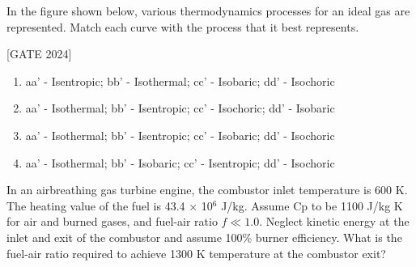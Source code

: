     \item In the figure shown below, various thermodynamics processes for an ideal gas are represented. Match each curve with the process that it best represents.
   \begin{figure}[!ht]
\centering
{}%

\end{figure}
   
        \hfill{[GATE 2024]}\begin{enumerate}
            \item aa' - Isentropic; bb' - Isothermal; cc' - Isobaric; dd' - Isochoric
            \item aa' - Isothermal; bb' - Isentropic; cc' - Isochoric; dd' - Isobaric
            \item aa' - Isothermal; bb' - Isentropic; cc' - Isobaric; dd' - Isochoric
            \item aa' - Isothermal; bb' - Isobaric; cc' - Isentropic; dd' - Isochoric
        \end{enumerate}
   

    \item In an airbreathing gas turbine engine, the combustor inlet temperature is 600 K. The heating value of the fuel is 43.4  $\times$ 10$^6$ J/kg. Assume Cp to be 1100 J/kg K for air and burned gases, and fuel-air ratio $f \ll 1.0$. Neglect kinetic energy at the inlet and exit of the combustor and assume 100\% burner efficiency. What is the fuel-air ratio required to achieve 1300 K temperature at the combustor exit?
   
